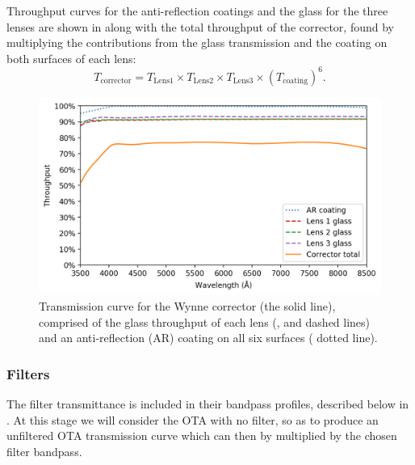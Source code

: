 \begin{colsection}
Throughput curves for the anti-reflection coatings and the glass for the three lenses are shown in  along with the total throughput of the corrector, found by multiplying the contributions from the glass transmission and the coating on both surfaces of each lens:
%
\begin{equation}
    T_\text{corrector} = T_\text{Lens1} \times
                         T_\text{Lens2} \times
                         T_\text{Lens3} \times
                         {(T_\text{coating})}^6.
    \label{eq:corrector}
\end{equation}

\newpage

\begin{figure}[t]
    \begin{center}
        \includegraphics[width=\linewidth]{images/throughput/trans_lenses.png}
    \end{center}
    \caption[Wynne corrector transmission curve]{
        Transmission curve for the Wynne corrector (the  solid line), comprised of the glass throughput of each lens (,  and  dashed lines) and an anti-reflection (AR) coating on all six surfaces ( dotted line).
    }\label{fig:trans_lenses}
\end{figure}

\subsubsection{Filters}

The filter transmittance is included in their bandpass profiles, described below in . At this stage we will consider the OTA with no filter, so as to produce an unfiltered OTA transmission curve which can then by multiplied by the chosen filter bandpass.


\end{colsection}
